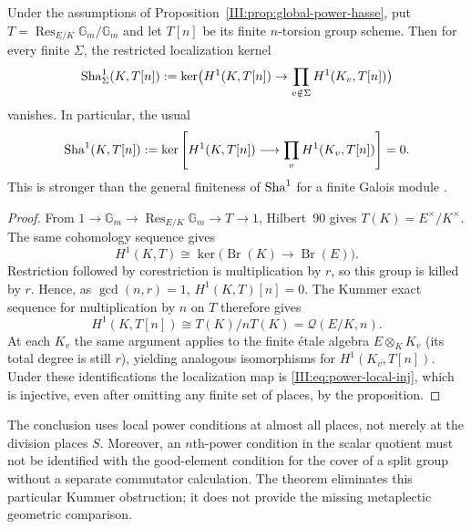 \begin{corollary}\label{III:cor:sha-power}
Under the assumptions of Proposition~\ref{III:prop:global-power-hasse},
put $T=\operatorname{Res}_{E/K}\mathbb G_m/\mathbb G_m$ and
let $T[n]$ be its finite $n$-torsion group scheme. Then for every finite $\Sigma$, the restricted localization kernel
\[\operatorname{Sha}^1_{\Sigma}(K,T[n]):=\ker\bigl(H^1(K,T[n])\to\prod_{v\notin\Sigma}H^1(K_v,T[n])\bigr)\]
vanishes. In particular, the usual
\begin{equation}\label{III:eq:sha-zero}
\operatorname{Sha}^1(K,T[n]):=
\ker\left[H^1(K,T[n])\longrightarrow
                \prod_v H^1(K_v,T[n])\right]=0.
\end{equation}
This is stronger than the general
finiteness of $\operatorname{Sha}^1$ for a finite Galois module
\cite[Chapter~I, \S4]{Mil06}.
\end{corollary}
\begin{proof}
From $1\to\mathbb G_m\to\operatorname{Res}_{E/K}\mathbb G_m
\to T\to1$, Hilbert~90 gives $T(K)=E^\times/K^\times$.
The same cohomology sequence gives
\[
 H^1(K,T)\cong
 \ker\bigl(\operatorname{Br}(K)\to\operatorname{Br}(E)\bigr).
\]
Restriction followed by corestriction is multiplication by $r$,
so this group is killed by $r$. Hence, as $\gcd(n,r)=1$,
$H^1(K,T)[n]=0$. The Kummer exact sequence for multiplication
by $n$ on $T$ therefore gives
\[
 H^1(K,T[n])\cong T(K)/nT(K)=\mathcal Q(E/K,n).
\]
At each $K_v$ the same argument applies to the finite \'{e}tale
algebra $E\otimes_K K_v$ (its total degree is still $r$), yielding
analogous isomorphisms for $H^1(K_v,T[n])$.
Under these identifications the localization map is
\eqref{III:eq:power-local-inj}, which is injective, even after omitting any finite set of places, by the proposition.
\end{proof}

\begin{remark}\label{III:rem:sha-limits}
The conclusion uses local power conditions at almost all places,
not merely at the division places $S$. Moreover, an $n$th-power
condition in the scalar quotient must not be identified with the
good-element condition for the cover of a split group without a
separate commutator calculation. The theorem eliminates this
particular Kummer obstruction; it does not provide the missing
metaplectic geometric comparison.
\end{remark}



